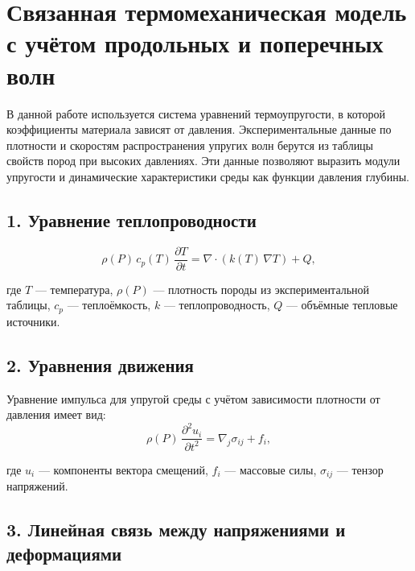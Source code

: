 
\usepackage[T2A]{fontenc}
\usepackage[utf8]{inputenc}
\usepackage[russian]{babel}
\usepackage{amsthm}
\usepackage{hyperref}
\usepackage{amsmath,amssymb}
\usepackage{booktabs}
\usepackage{longtable}
\usepackage{geometry}
\geometry{margin=1in}

\section*{Связанная термомеханическая модель с учётом продольных и поперечных волн}

В данной работе используется система уравнений термоупругости, в которой 
коэффициенты материала зависят от давления. 
Экспериментальные данные по плотности и скоростям распространения упругих волн 
берутся из таблицы свойств пород при высоких давлениях. 
Эти данные позволяют выразить модули упругости и динамические характеристики среды 
как функции давления глубины.

\subsection*{1. Уравнение теплопроводности}

\begin{equation}
\rho(P)\, c_p(T)\, \frac{\partial T}{\partial t}
=
\nabla \cdot \left( k(T)\, \nabla T \right)
+ Q,
\label{eq:heat}
\end{equation}

где $T$ — температура,
$\rho(P)$ — плотность породы из экспериментальной таблицы,
$c_p$ — теплоёмкость,
$k$ — теплопроводность,
$Q$ — объёмные тепловые источники.

\subsection*{2. Уравнения движения}

Уравнение импульса для упругой среды с учётом зависимости плотности от давления имеет вид:
\begin{equation}
\rho(P)\, \frac{\partial^2 u_i}{\partial t^2}
=
\nabla_j \sigma_{ij}
+ f_i,
\label{eq:motion}
\end{equation}

где $u_i$ — компоненты вектора смещений,
$f_i$ — массовые силы,
$\sigma_{ij}$ — тензор напряжений.

\subsection*{3. Линейная связь между напряжениями и деформациями}

